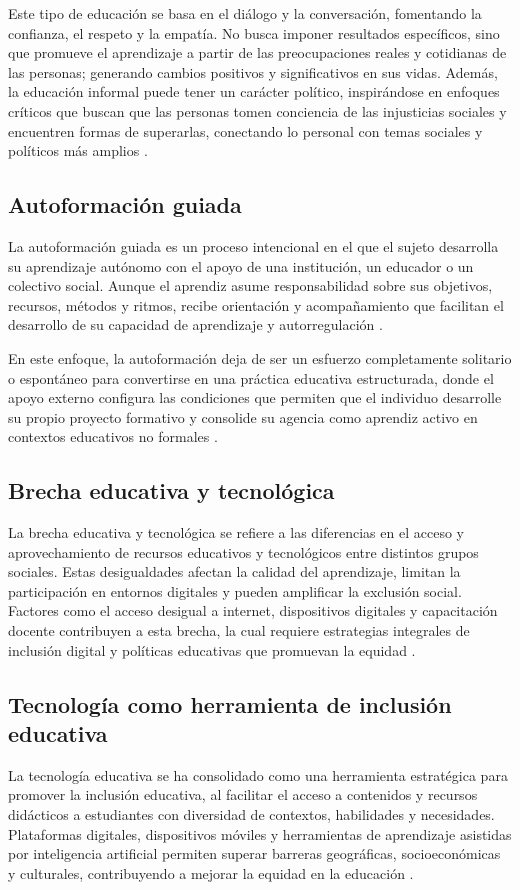 Este tipo de educación se basa en el diálogo y la conversación, fomentando la
confianza, el respeto y la empatía. No busca imponer resultados específicos,
sino que promueve el aprendizaje a partir de las preocupaciones reales y
cotidianas de las personas; generando cambios positivos y significativos en sus
vidas. Además, la educación informal puede tener un carácter político,
inspirándose en enfoques críticos que buscan que las personas tomen conciencia
de las injusticias sociales y encuentren formas de superarlas, conectando lo
personal con temas sociales y políticos más amplios \cite{mills2014informal}.

\subsection{Autoformación guiada}
La autoformación guiada es un proceso intencional en el que el sujeto
desarrolla su aprendizaje autónomo con el apoyo de una institución, un educador
o un colectivo social. Aunque el aprendiz asume responsabilidad sobre sus
objetivos, recursos, métodos y ritmos, recibe orientación y acompañamiento que
facilitan el desarrollo de su capacidad de aprendizaje y autorregulación
\cite{mills2014informal}.

En este enfoque, la autoformación deja de ser un esfuerzo completamente
solitario o espontáneo para convertirse en una práctica educativa estructurada,
donde el apoyo externo configura las condiciones que permiten que el individuo
desarrolle su propio proyecto formativo y consolide su agencia como aprendiz
activo en contextos educativos no formales \cite{mills2014informal}.

\subsection{Brecha educativa y tecnológica}
La brecha educativa y tecnológica se refiere a las diferencias en el acceso y
aprovechamiento de recursos educativos y tecnológicos entre distintos grupos
sociales. Estas desigualdades afectan la calidad del aprendizaje, limitan la
participación en entornos digitales y pueden amplificar la exclusión social.
Factores como el acceso desigual a internet, dispositivos digitales y
capacitación docente contribuyen a esta brecha, la cual requiere estrategias
integrales de inclusión digital y políticas educativas que promuevan la equidad
\cite{van2005digital, unesco2023monitoring}.

\subsection{Tecnología como herramienta de inclusión educativa}
La tecnología educativa se ha consolidado como una herramienta estratégica para
promover la inclusión educativa, al facilitar el acceso a contenidos y recursos
didácticos a estudiantes con diversidad de contextos, habilidades y
necesidades. Plataformas digitales, dispositivos móviles y herramientas de
aprendizaje asistidas por inteligencia artificial permiten superar barreras
geográficas, socioeconómicas y culturales, contribuyendo a mejorar la equidad
en la educación \cite{teras2022education, unesco2023monitoring}.

